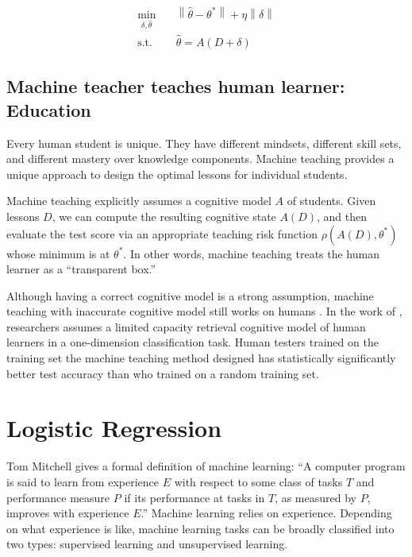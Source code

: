         \begin{equation*}
        \begin{aligned}
            \min_{\delta, \hat{\theta}} \quad &
            \left\lVert\hat{\theta} - \theta^*\right\rVert + \eta \left\lVert\delta\right\rVert \\
            \textrm{s.t.} \quad & \hat{\theta} = A(D+\delta)
        \end{aligned}
        \end{equation*}

    \subsection{Machine teacher teaches human learner: Education}

        Every human student is unique.
        They have different mindsets, different skill sets, and different mastery over knowledge components.
        Machine teaching provides a unique approach to design the optimal lessons for individual students.

        Machine teaching explicitly assumes a cognitive model $A$ of students.
        Given lessons $D$, we can compute the resulting cognitive state $A(D)$,
        and then evaluate the test score via an appropriate teaching risk function $\rho(A(D), \theta^*)$
        whose minimum is at $\theta^*$.
        In other words, machine teaching treats the human learner as a ``transparent box.''

        Although having a correct cognitive model is a strong assumption,
        machine teaching with inaccurate cognitive model still works on humans \cite{Whitehill2017}.
        In the work of \cite{Patil2014},
        researchers assumes a limited capacity retrieval cognitive model of human learners
        in a one-dimension classification task.
        Human testers trained on the training set the machine teaching method designed
        has statistically significantly better test accuracy than who trained on a random training set.


\section{Logistic Regression}

    Tom Mitchell gives a formal definition of machine learning:
    ``A computer program is said to learn from experience $E$ with respect to some class of tasks $T$
    and performance measure $P$ if its performance at tasks in $T$, as measured by $P$, improves with experience $E$.''
    \cite{Mitchell1997}
    Machine learning relies on experience.
    Depending on what experience is like, machine learning tasks can be broadly classified into two types:
    supervised learning and unsupervised learning.


